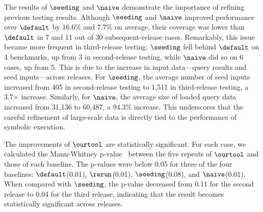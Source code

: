 The results of $\seeding$ and $\naive$ demonstrate the importance of refining previous testing results. Although $\seeding$ and $\naive$ improved performance over $\default$ by 16.6\% and 7.7\% on average, their coverage was lower than $\default$ in 7 and 11 out of 30 subsequent-release cases. Remarkably, this issue became more frequent in third-release testing: $\seeding$ fell behind $\default$ on 4 benchmarks, up from 3 in second-release testing, while $\naive$ did so on 6 cases, up from 5. 
This is due to the increase in input data---query results and seed inputs---across releases. For $\seeding$, the average number of seed inputs increased from 405 in second-release testing to 1,511 in third-release testing, a 3.7× increase. Similarly, for $\naive$, the average size of loaded query data increased from 31,136 to 60,487, a 94.3\% increase. 
This underscores that the careful refinement of large-scale data is directly tied to the performance of symbolic execution.

The improvements of $\ourtool$ are statistically significant. For each case, we calculated the Mann-Whitney p-value~\cite{mann1947} between the five repeats of $\ourtool$ and those of each baseline. The p-values were below 0.05 for three of the four baselines: $\default$(0.01), $\rerun$(0.01), $\seeding$(0.08), and $\naive$(0.01). When compared with $\seeding$, the p-value decreased from 0.11 for the second release to 0.04 for the third release, indicating that the result becomes statistically significant across releases.


